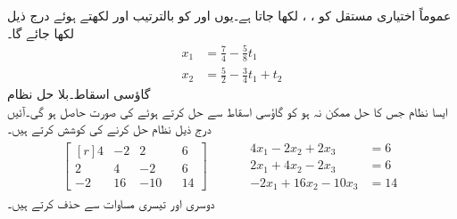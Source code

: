 عموماً اختیاری مستقل کو ، ،  لکھا جاتا ہے۔یوں  اور  کو بالترتیب  اور  لکھتے ہوئے درج ذیل لکھا جائے گا۔
\begin{align*}
x_1&=\tfrac{7}{4}-\tfrac{5}{8}t_1\\
x_2&=\tfrac{5}{2}-\tfrac{3}{4}t_1+t_2
\end{align*}
\quad گاؤسی اسقاط۔بلا حل نظام\\
ایسا نظام جس کا حل ممکن نہ ہو کو گاؤسی اسقاط سے حل کرتے ہوئے  کی صورت حاصل ہو گی۔آئیں درج ذیل نظام حل کرنے کی کوشش کرتے ہیں۔
\begin{gather*}
\begin{bmatrix*}[r] 4&-2&2&&6\\2&4&-2&&6\\-2&16&-10&&14  \end{bmatrix*}\quad \quad \quad 
\begin{aligned}
4x_1-2x_2+2x_3&=6\\
2x_1+4x_2-2x_3&=6\\
-2x_1+16x_2-10x_3&=14
\end{aligned}
\end{gather*}
دوسری اور تیسری مساوات سے  حذف کرتے ہیں۔

